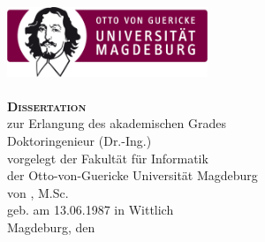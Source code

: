 \begin{titlepage}
\setlength{\parindent}{0cm}%
\begin{Large}
\begin{centering}
\includegraphics[width=6cm]{figures/OvGU-Logo.jpg}\\
\vspace*{2cm}
{\scshape\bfseries\huge \thetitle}\\
\vspace*{2\baselineskip}
{\scshape\bfseries\LARGE Dissertation}\\
\vspace*{\baselineskip}
zur Erlangung des akademischen Grades\\
\vspace*{\baselineskip}
Doktoringenieur (Dr.-Ing.)\\
\vfill
vorgelegt der Fakultät für Informatik\\
der Otto-von-Guericke Universität Magdeburg\\
\vspace*{\baselineskip}
von \theauthor, M.Sc.\\
\vspace*{\baselineskip}
geb. am 13.06.1987 in Wittlich\\
\vspace*{\baselineskip}
Magdeburg, den \thedate\\
\end{centering}
\end{Large}
\end{titlepage}